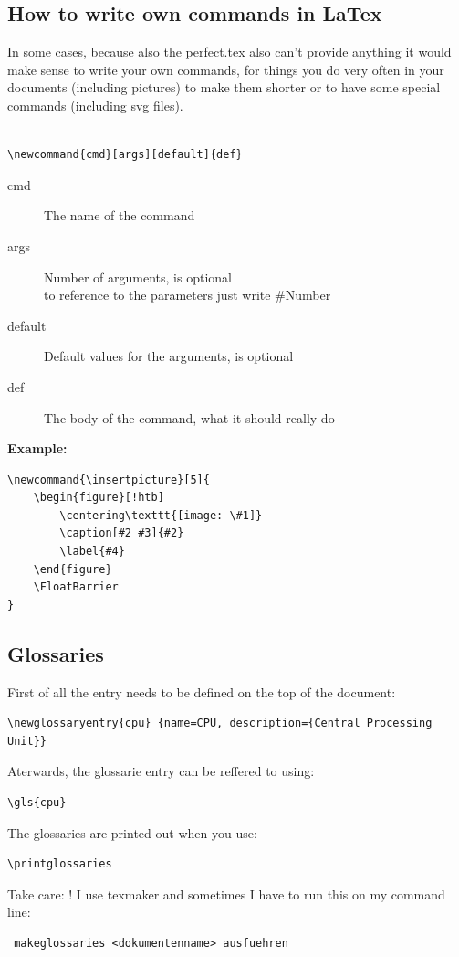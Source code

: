 \documentclass[12pt]{article}
\newcommand{\insertpicture}[5]{{
	\begin{figure}[!htb]
		\centering\texttt{[image: \#1]}
		\caption[#2 #3]{#2}
		\label{#4}
	\end{figure}
	\FloatBarrier
}}
\begin{document}
\newpage
\subsection{How to write own commands in LaTex}
In some cases, because also the perfect.tex also can't provide anything it would make sense to write your own commands, for things you do very often in your documents (including pictures) to make them shorter or to have some special commands (including svg files).\\\\
\begin{lstlisting}
\newcommand{cmd}[args][default]{def}
\end{lstlisting}
\begin{description}
\item[cmd] The name of the command
\item[args] Number of arguments, is optional\\to reference to the parameters just write \#Number
\item[default] Default values for the arguments, is optional
\item[def] The body of the command, what it should really do\\
\end{description}
\textbf{Example:}
\begin{lstlisting}
\newcommand{\insertpicture}[5]{
	\begin{figure}[!htb]
		\centering\texttt{[image: \#1]}
		\caption[#2 #3]{#2}
		\label{#4}
	\end{figure}
	\FloatBarrier
}
\end{lstlisting}



\subsection{Glossaries}
First of all the entry needs to be defined on the top of the document:
\begin{lstlisting}
\newglossaryentry{cpu} {name=CPU, description={Central Processing Unit}}
\end{lstlisting}
Aterwards, the glossarie entry can be reffered to using:
\begin{lstlisting}
\gls{cpu}
\end{lstlisting}
The glossaries are printed out when you use: 
\begin{lstlisting}
\printglossaries
\end{lstlisting}
Take care: ! I use texmaker and sometimes I have to run this on my command line:
\begin{lstlisting}
 makeglossaries <dokumentenname> ausfuehren
\end{lstlisting}


\newpage

\listoftables
\listoffigures
\printglossaries
\end{document}
